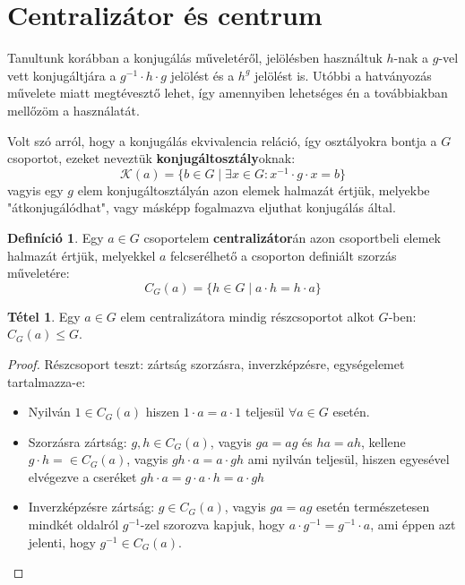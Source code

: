\documentclass[12pt]{book}
\theoremstyle{plain} %
\theoremstyle{definition} %
\newtheorem{defi/}{Definíció}[section]
\newenvironment{defi}
  {\renewcommand{\qedsymbol}{$\clubsuit$}%
   \pushQED{\qed}\begin{defi/}}
  {\popQED\end{defi/}}
\newtheorem{theo/}{Tétel}[section]
\newenvironment{theo}
  {\renewcommand{\qedsymbol}{$\clubsuit$}%
   \pushQED{\qed}\begin{theo/}}
  {\popQED\end{theo/}}
\theoremstyle{remark}
\renewcommand\qedsymbol{$\blacksquare$}
\numberwithin{equation}{section}  %
\begin{document}
	\section{Centralizátor és centrum}
	
	Tanultunk korábban a konjugálás műveletéről, jelölésben használtuk $h$-nak a $g$-vel vett konjugáltjára a $g^{-1}\cdot h\cdot g$ jelölést és a $h^g$ jelölést is. Utóbbi a hatványozás művelete miatt megtévesztő lehet, így amennyiben lehetséges én a továbbiakban mellőzöm a használatát.
	
	Volt szó arról, hogy a konjugálás ekvivalencia reláció, így osztályokra bontja a $G$ csoportot, ezeket neveztük \textbf{konjugáltosztály}oknak:
	\[ \mathcal{K}(a) = \{b \in G \mid \exists x\in G\colon x^{-1} \cdot g \cdot x = b  \}  \]
	vagyis egy $g$ elem konjugáltosztályán azon elemek halmazát értjük, melyekbe "átkonjugálódhat", vagy másképp fogalmazva eljuthat konjugálás által.
	
	\begin{defi}
		Egy $a\in G$ csoportelem \textbf{centralizátor}án azon csoportbeli elemek halmazát értjük, melyekkel $a$ felcserélhető a csoporton definiált szorzás műveletére:
		\[ C_G(a) = \{ h\in G \mid a\cdot h = h\cdot a  \}  \]
	\end{defi}

	\begin{theo}
		Egy $a\in G$ elem centralizátora mindig részcsoportot alkot $G$-ben: $C_G(a) \leq G$.
	\end{theo}

	\begin{proof}
		Részcsoport teszt: zártság szorzásra, inverzképzésre, egységelemet tartalmazza-e:
		\begin{itemize}
			\item Nyilván $1\in C_G(a)$ hiszen $1\cdot a = a\cdot 1$ teljesül $\forall a\in G$ esetén.
			\item Szorzásra zártság: $g,h\in C_G(a)$, vagyis $ga = ag$ és $ha=ah$, kellene $g\cdot h = \in C_G(a)$, vagyis $gh\cdot a = a\cdot gh$ ami nyilván teljesül, hiszen egyesével elvégezve a cseréket $gh\cdot a = g\cdot a \cdot h = a \cdot gh$
			\item Inverzképzésre zártság: $g\in C_G(a)$, vagyis $ga=ag$ esetén természetesen mindkét oldalról $g^{-1}$-zel szorozva kapjuk, hogy $a\cdot g^{-1} = g^{-1} \cdot a$, ami éppen azt jelenti, hogy $g^{-1}\in C_G(a)$.
		\end{itemize}
	\end{proof}
	
\end{document}
